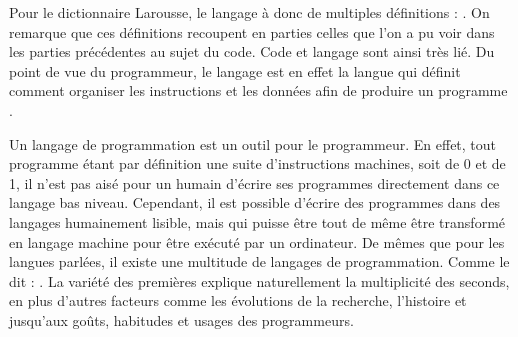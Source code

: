 \documentclass[12pt]{article} %
\begin{document}
Pour le dictionnaire Larousse, le langage à donc de multiples définitions :
\cite{Nimmo2017-ya}. On remarque que ces définitions recoupent en parties celles que l'on a pu voir dans les parties précédentes au sujet du code. Code et langage sont ainsi très lié. Du point de vue du programmeur, le langage est en effet la langue qui définit comment organiser les instructions et les données afin de produire un programme \cite{BernardAmade2019}.

Un langage de programmation est un outil pour le programmeur. En effet, tout programme étant par définition une suite d'instructions machines, soit de 0 et de 1, il n'est pas aisé pour un humain d'écrire ses programmes directement dans ce langage bas niveau. Cependant, il est possible d'écrire des programmes dans des langages humainement lisible, mais qui puisse être tout de même être transformé en langage machine pour être exécuté par un ordinateur. De mêmes que pour les langues parlées, il existe une multitude de langages de programmation. Comme le dit \citeauthor{BernardAmade2019} :  \cite{BernardAmade2019}. La variété des premières explique naturellement la multiplicité des seconds, en plus d'autres facteurs comme les évolutions de la recherche, l'histoire et jusqu'aux goûts, habitudes et usages des programmeurs.
\end{document}
